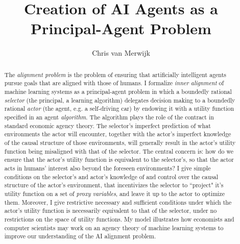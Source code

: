 \documentclass[12pt]{article}
\title{Creation of AI Agents as a Principal-Agent Problem}
\author{Chris van Merwijk}
\date{}
\begin{document}
\maketitle


\begin{abstract}
	\noindent The \textit{alignment problem} is the problem of ensuring that artificially intelligent agents pursue goals that are aligned with those of humans. I formalize \textit{inner alignment} of machine learning systems as a principal-agent problem in which a boundedly rational \textit{selector} (the principal, a learning algorithm) delegates decision making to a boundedly rational \textit{actor} (the agent, e.g. a self-driving car) by endowing it with a utility function specified in an agent \textit{algorithm}. The algorithm plays the role of the contract in standard economic agency theory. The selector's imperfect prediction of what environments the actor will encounter, together with the actor's imperfect knowledge of the causal structure of those environments, will generally result in the actor's utility function being misaligned with that of the selector. The central concern is: how do we ensure that the actor's utility function is equivalent to the selector's, so that the actor acts in humans' interest also beyond the foreseen environments? I give simple conditions on the selector's and actor's knowledge of and control over the causal structure of the actor's environment, that incentivizes the selector to ``project" it's utility function on a set of \textit{proxy variables}, and leave it up to the actor to optimize them. Moreover, I give restrictive necessary and sufficient conditions under which the actor's utility function is necessarily equivalent to that of the selector, under no restrictions on the space of utility functions. My model illustrates how economists and computer scientists may work on an agency theory of machine learning systems to improve our understanding of the AI alignment problem.
\end{abstract}
\end{document}
